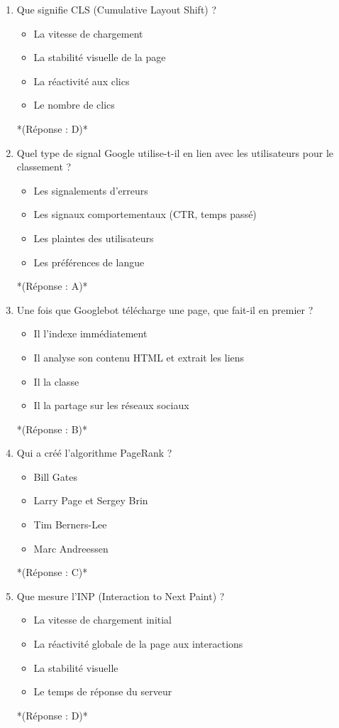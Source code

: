 \documentclass[12pt,a4paper,twoside]{report}
\begin{document}
\begin{enumerate}
\item Que signifie CLS (Cumulative Layout Shift) ?
\begin{itemize}
\item[A)] La vitesse de chargement
\item[B)] La stabilité visuelle de la page
\item[C)] La réactivité aux clics
\item[D)] Le nombre de clics
\end{itemize}
*(Réponse : D)*

\item Quel type de signal Google utilise-t-il en lien avec les utilisateurs pour le classement ?
\begin{itemize}
\item[A)] Les signalements d'erreurs
\item[B)] Les signaux comportementaux (CTR, temps passé)
\item[C)] Les plaintes des utilisateurs
\item[D)] Les préférences de langue
\end{itemize}
*(Réponse : A)*

\item Une fois que Googlebot télécharge une page, que fait-il en premier ?
\begin{itemize}
\item[A)] Il l'indexe immédiatement
\item[B)] Il analyse son contenu HTML et extrait les liens
\item[C)] Il la classe
\item[D)] Il la partage sur les réseaux sociaux
\end{itemize}
*(Réponse : B)*

\item Qui a créé l'algorithme PageRank ?
\begin{itemize}
\item[A)] Bill Gates
\item[B)] Larry Page et Sergey Brin
\item[C)] Tim Berners-Lee
\item[D)] Marc Andreessen
\end{itemize}
*(Réponse : C)*

\item Que mesure l'INP (Interaction to Next Paint) ?
\begin{itemize}
\item[A)] La vitesse de chargement initial
\item[B)] La réactivité globale de la page aux interactions
\item[C)] La stabilité visuelle
\item[D)] Le temps de réponse du serveur
\end{itemize}
*(Réponse : D)*


\end{enumerate}
\end{document}
